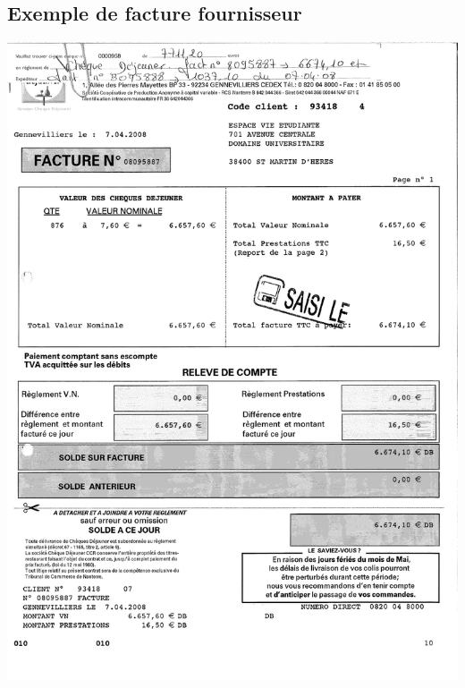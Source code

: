 \subsection{Exemple de facture fournisseur}
\begin{center}
\includegraphics[scale=0.7]{annexes/images/chequedejeuner_facture.pdf}
\end{center}
